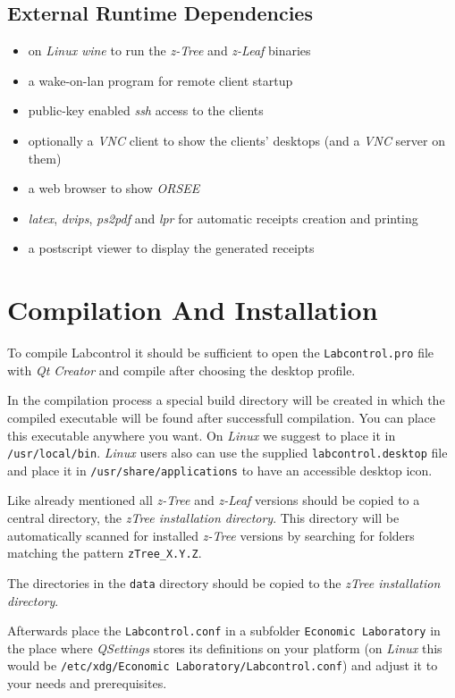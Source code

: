 \documentclass[a4paper,10pt]{article}
\begin{document}
\subsection{External Runtime Dependencies}

\begin{itemize}
  \item on \emph{Linux} \emph{wine} to run the \emph{z-Tree} and \emph{z-Leaf} binaries
  \item a wake-on-lan program for remote client startup
  \item public-key enabled \emph{ssh} access to the clients
  \item optionally a \emph{VNC} client to show the clients' desktops (and a \emph{VNC} server on them)
  \item a web browser to show \emph{ORSEE}
  \item \emph{latex}, \emph{dvips}, \emph{ps2pdf} and \emph{lpr} for automatic receipts creation and printing
  \item a postscript viewer to display the generated receipts
\end{itemize}

\section{Compilation And Installation}

To compile Labcontrol it should be sufficient to open the \texttt{Labcontrol.pro} file with \emph{Qt Creator} and compile after choosing the desktop profile.

In the compilation process a special build directory will be created in which the compiled executable will be found after successfull compilation. You can place this executable anywhere you want. On \emph{Linux} we suggest to place it in \texttt{/usr/local/bin}. \emph{Linux} users also can use the supplied \texttt{labcontrol.desktop} file and place it in \texttt{/usr/share/applications} to have an accessible desktop icon.

Like already mentioned all \emph{z-Tree} and \emph{z-Leaf} versions should be copied to a central directory, the \emph{zTree installation directory}. This directory will be automatically scanned for installed \emph{z-Tree} versions by searching for folders matching the pattern \texttt{zTree\_X.Y.Z}.

The directories in the \texttt{data} directory should be copied to the \emph{zTree installation directory}.

Afterwards place the \texttt{Labcontrol.conf} in a subfolder \texttt{Economic Laboratory} in the place where \emph{QSettings} stores its definitions on your platform (on \emph{Linux} this would be \texttt{/etc/xdg/Economic Laboratory/Labcontrol.conf}) and adjust it to your needs and prerequisites.
\end{document}
